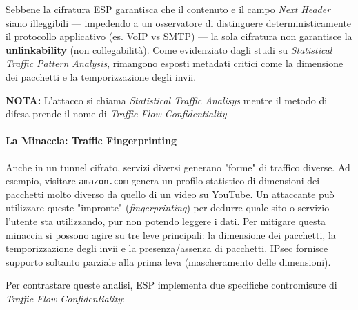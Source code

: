\documentclass[a4paper, 11pt]{article}
\begin{document}
Sebbene la cifratura ESP garantisca che il contenuto e il campo \textit{Next Header} siano illeggibili — impedendo a un osservatore di distinguere deterministicamente il protocollo applicativo (es. VoIP vs SMTP) — la sola cifratura non garantisce la \textbf{unlinkability} (non collegabilità).
Come evidenziato dagli studi su \textit{Statistical Traffic Pattern Analysis}, rimangono esposti metadati critici come la dimensione dei pacchetti e la temporizzazione degli invii.

\textbf{NOTA:} L'attacco si chiama \textit{Statistical Traffic Analisys} mentre il metodo di difesa prende il nome di \textit{Traffic Flow Confidentiality}.

\paragraph{La Minaccia: Traffic Fingerprinting}
Anche in un tunnel cifrato, servizi diversi generano "forme" di traffico diverse. Ad esempio, visitare \texttt{amazon.com} genera un profilo statistico di dimensioni dei pacchetti molto diverso da quello di un video su YouTube. Un attaccante può utilizzare queste "impronte" (\textit{fingerprinting}) per dedurre quale sito o servizio l'utente sta utilizzando, pur non potendo leggere i dati.
Per mitigare questa minaccia si possono agire su tre leve principali: la dimensione dei pacchetti, la temporizzazione degli invii e la presenza/assenza di pacchetti. IPsec fornisce supporto soltanto parziale alla prima leva (mascheramento delle dimensioni).

Per contrastare queste analisi, ESP implementa due specifiche contromisure di \textit{Traffic Flow Confidentiality}:
\end{document}
